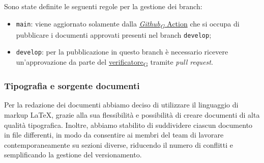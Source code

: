 Sono state definite le seguenti regole per la gestione dei branch:
\begin{itemize}
	\item \texttt{main}: viene aggiornato solamente dalla \href{https://7last.github.io/docs/pb/documentazione-interna/glossario\#github}{\textit{Github\textsubscript{G}} Action} che si occupa di pubblicare i documenti approvati presenti nel branch \texttt{develop};
	\item \texttt{develop}: per la pubblicazione in questo branch è necessario ricevere un'approvazione da parte del \href{https://7last.github.io/docs/pb/documentazione-interna/glossario\#verificatore}{verificatore\textsubscript{G}} tramite \textit{pull request}.
\end{itemize}

\subsubsection{Tipografia e sorgente documenti}
Per la redazione dei documenti abbiamo deciso di utilizzare il linguaggio di markup LaTeX, grazie alla sua flessibilità e possibilità di creare documenti di alta qualità tipografica.
Inoltre, abbiamo stabilito di suddividere ciascun documento in file differenti, in modo da consentire ai membri del team di lavorare contemporaneamente su sezioni diverse,
riducendo il numero di conflitti e semplificando la gestione del versionamento.

